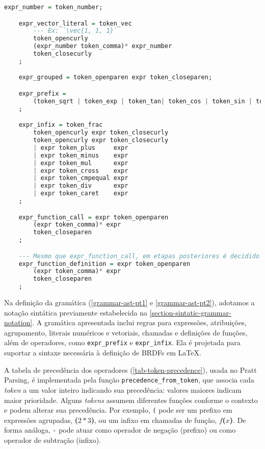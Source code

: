 \begin{codigo}[H]
        \caption{\small Gramática para \texttt{EquantionLang} parte 2 de 2.}
        \label{grammar-ast-pt2}
\begin{lstlisting}[language=haskell, basicstyle=\ttfamily\footnotesize,numbers=none, inputencoding=utf8]
    expr_number = token_number;

    expr_vector_literal = token_vec
        --- Ex: `\vec{1, 1, 1}`
        token_opencurly
        (expr_number token_comma)* expr_number
        token_closecurly
    ;

    expr_grouped = token_openparen expr token_closeparen;

    expr_prefix =
        (token_sqrt | token_exp | token_tan| token_cos | token_sin | token_arctan | token_arccos | token_arcsin | token_minus | token_plus) expr
    ;

    expr_infix = token_frac
        token_opencurly expr token_closecurly
        token_opencurly expr token_closecurly
        | expr token_plus     expr
        | expr token_minus    expr
        | expr token_mul      expr
        | expr token_cross    expr
        | expr token_cmpequal expr
        | expr token_div      expr
        | expr token_caret    expr
    ;

    expr_function_call = expr token_openparen
        (expr token_comma)* expr
        token_closeparen
    ;

    --- Mesmo que expr_function_call, em etapas posteriores é decidido qual tipo realmente é.
    expr_function_definition = expr token_openparen
        (expr token_comma)* expr
        token_closeparen
    ;
\end{lstlisting}
\end{codigo}

Na definição da gramática (\autoref{grammar-ast-pt1} e \autoref{grammar-ast-pt2}), adotamos a notação sintática previamente estabelecida na \autoref{section-sintatic-grammar-notation}.
A gramática apresentada inclui regras para expressões, atribuições, agrupamento, literais numéricos e vetoriais, chamadas e definições de funções, além de operadores, como \verb"expr_prefix" e \verb"expr_infix". Ela é projetada para suportar a sintaxe necessária à definição de BRDFs em \LaTeX{}.



A tabela de precedência dos operadores (\autoref{tab-token-precedence}), usada no Pratt Parsing, é implementada pela função \texttt{precedence\_from\_token}, que associa cada \textit{token} a um valor inteiro indicando sua precedência: valores maiores indicam maior prioridade. Alguns \textit{tokens} assumem diferentes funções conforme o contexto e podem alterar sua precedência. Por exemplo, \texttt{(} pode ser um prefixo em expressões agrupadas, \textbf{(}$2*3$\textbf{)}, ou um infixo em chamadas de função, $f$\textbf{(}$x$\textbf{)}. De forma análoga, \texttt{-} pode atuar como operador de negação (prefixo) ou como operador de subtração (infixo). 


